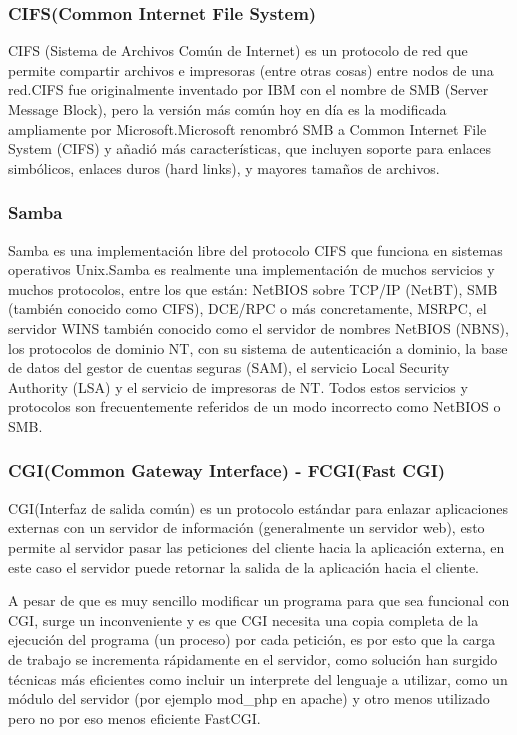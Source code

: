 \subsubsection*{CIFS(Common Internet File System)}

CIFS (Sistema de Archivos Común de Internet) es un protocolo de red que permite compartir archivos e impresoras (entre otras cosas) entre nodos de una red.\newline CIFS fue originalmente inventado por IBM con el nombre de SMB (Server Message Block), pero la versión más común hoy en día es la modificada ampliamente por Microsoft.\newline  Microsoft renombró SMB a Common Internet File System (CIFS) y añadió más características, que incluyen soporte para enlaces simbólicos, enlaces duros (hard links), y mayores tamaños de archivos.


\subsubsection*{Samba \cite{samba} }

Samba es una implementación libre del protocolo CIFS que funciona en sistemas operativos Unix.\newline Samba es realmente una implementación de muchos servicios y muchos protocolos, entre los que están: NetBIOS sobre TCP/IP (NetBT), SMB (también conocido como CIFS), DCE/RPC o más concretamente, MSRPC, el servidor WINS también conocido como el servidor de nombres NetBIOS (NBNS), los protocolos de dominio NT, con su sistema de autenticación a dominio, la base de datos del gestor de cuentas seguras (SAM), el servicio Local Security Authority (LSA) y el servicio de impresoras de NT. Todos estos servicios y protocolos son frecuentemente referidos de un modo incorrecto como NetBIOS o SMB.


\subsubsection*{CGI(Common Gateway Interface) - FCGI(Fast CGI)}

CGI(Interfaz de salida común) es un protocolo estándar para enlazar aplicaciones externas con un servidor de información (generalmente un servidor web), esto permite al servidor pasar las peticiones del cliente hacia la aplicación externa, en este caso el servidor puede retornar la salida de la aplicación hacia el cliente.

A pesar de que es muy sencillo modificar un programa para que sea funcional con CGI, surge un inconveniente y es que CGI necesita una copia completa de la ejecución del programa (un proceso) por cada petición, es por esto que la carga de trabajo se incrementa rápidamente en el servidor, como solución han surgido técnicas más eficientes como incluir un interprete del lenguaje a utilizar, como un módulo del servidor (por ejemplo mod\_php en apache) y otro menos utilizado pero no por eso menos eficiente FastCGI.

